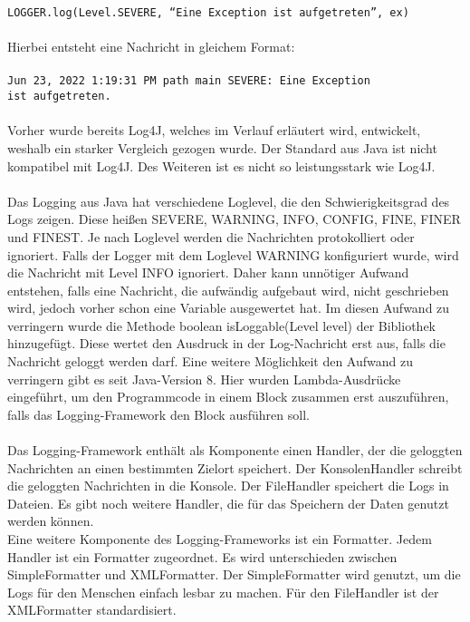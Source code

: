 {    \texttt{LOGGER.log(Level.SEVERE, \enquote{Eine Exception ist aufgetreten}, ex)}
    \\
    \\
    Hierbei entsteht eine Nachricht in gleichem Format:
    \\
    \\
    \hspace*{10mm}
    \texttt{Jun 23, 2022 1:19:31 PM path main SEVERE: Eine Exception
    \\
    \hspace*{30mm} ist aufgetreten.}
    \\
    \\
    Vorher wurde bereits Log4J, welches im Verlauf erläutert wird, entwickelt, weshalb ein starker Vergleich gezogen wurde.
    Der Standard aus Java ist nicht kompatibel mit Log4J.
    Des Weiteren ist es nicht so leistungsstark wie Log4J.
    \\
    \\
    Das Logging aus Java hat verschiedene Loglevel, die den Schwierigkeitsgrad des Logs zeigen.
    Diese heißen SEVERE, WARNING, INFO, CONFIG, FINE, FINER und FINEST.
    Je nach Loglevel werden die Nachrichten protokolliert oder ignoriert.
    Falls der Logger mit dem Loglevel WARNING konfiguriert wurde, wird die Nachricht mit Level INFO ignoriert.
    Daher kann unnötiger Aufwand entstehen, falls eine Nachricht, die aufwändig aufgebaut wird, nicht geschrieben wird, jedoch vorher schon eine Variable ausgewertet hat.
    Im diesen Aufwand zu verringern wurde die Methode boolean isLoggable(Level level) der Bibliothek hinzugefügt.
    Diese wertet den Ausdruck in der Log-Nachricht erst aus, falls die Nachricht geloggt werden darf.
    Eine weitere Möglichkeit den Aufwand zu verringern gibt es seit Java-Version 8.
    Hier wurden Lambda-Ausdrücke eingeführt, um den Programmcode in einem Block zusammen erst auszuführen, falls das Logging-Framework den Block ausführen soll.
    \\
    \\
    Das Logging-Framework enthält als Komponente einen Handler, der die geloggten Nachrichten an einen bestimmten Zielort speichert.
    Der KonsolenHandler schreibt die geloggten Nachrichten in die Konsole.
    Der FileHandler speichert die Logs in Dateien.
    Es gibt noch weitere Handler, die für das Speichern der Daten genutzt werden können.
    \\
    Eine weitere Komponente des Logging-Frameworks ist ein Formatter.
    Jedem Handler ist ein Formatter zugeordnet.
    Es wird unterschieden zwischen SimpleFormatter und XMLFormatter.
    Der SimpleFormatter wird genutzt, um die Logs für den Menschen einfach lesbar zu machen.
    Für den FileHandler ist der XMLFormatter standardisiert.
}\autocite{rheinwerk, baeldung, examples}

